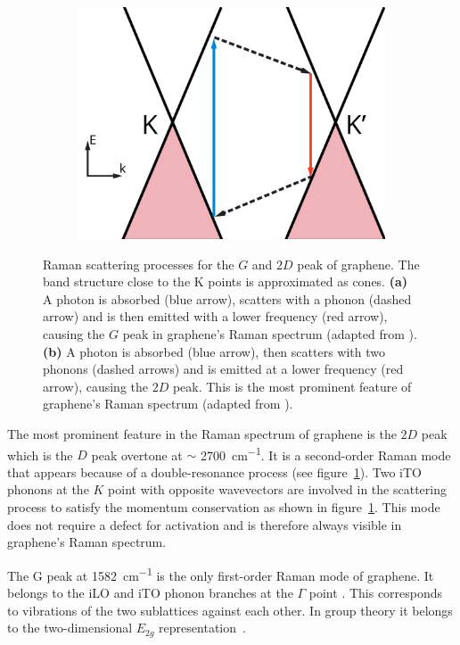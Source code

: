\begin{figure}[!h]
\begin{subfigure}[t]{0.45\textwidth}
    \includegraphics[width=\textwidth]{./images/2d-mode.pdf}
  \end{subfigure}
  \caption{Raman scattering processes for the $G$ and $2D$ peak of graphene. The band structure close to the K points is approximated as cones. \textbf{(a)} A photon is absorbed (blue arrow), scatters with a phonon (dashed arrow) and is then emitted with a lower frequency (red arrow), causing the $G$ peak in graphene's Raman spectrum (adapted from \cite{Ferrari2013}). \textbf{(b)} A photon is absorbed (blue arrow), then scatters with two phonons (dashed arrows) and is emitted at a lower frequency (red arrow), causing the $2D$ peak. This is the most prominent feature of graphene's Raman spectrum (adapted from \cite{Ferrari2013}).}
  \label{fig:raman-modes}
\end{figure}

The most prominent feature in the Raman spectrum of graphene is the $2D$ peak which is the $D$ peak overtone at $\sim$ \SI{2700}{cm^{-1}}. It is a second-order Raman mode that appears because of a double-resonance process\cite{double-resonance} (see figure~\ref{fig:raman-modes}). Two iTO phonons at the $K$ point with opposite wavevectors are involved in the scattering process to satisfy the momentum conservation as shown in figure~\ref{fig:raman-modes}. This mode does not require a defect for activation and is therefore always visible in graphene's Raman spectrum.

The G peak at \SI{1582}{cm^{-1}} is the only first-order Raman mode of graphene. It belongs to the iLO and iTO phonon branches at the $\Gamma$ point \cite{Ferrari2013}. This corresponds to vibrations of the two sublattices against each other. In group theory it belongs to the two-dimensional $E_{2g}$ representation~\cite{yucordona}.
